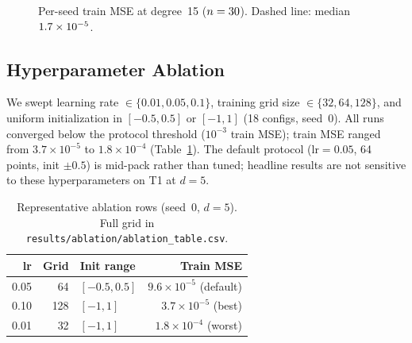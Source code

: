\documentclass[11pt,a4paper]{article}
\begin{document}
\begin{figure}[ht]
\centering
{}
\caption{Per-seed train MSE at degree~15 ($n=30$). Dashed line: median $1.7\times10^{-5}$.}
\label{fig:multiseed_d15}
\end{figure}

\subsection{Hyperparameter Ablation}
\label{sec:ablation}

We swept learning rate $\in\{0.01,0.05,0.1\}$, training grid size $\in\{32,64,128\}$, and uniform initialization in $[-0.5,0.5]$ or $[-1,1]$ (18 configs, seed~0). All runs converged below the protocol threshold ($10^{-3}$ train MSE); train MSE ranged from $3.7\times10^{-5}$ to $1.8\times10^{-4}$ (Table~\ref{tab:ablation}). The default protocol ($\mathrm{lr}=0.05$, 64 points, init $\pm0.5$) is mid-pack rather than tuned; headline results are not sensitive to these hyperparameters on T1 at $d=5$.

\begin{table}[ht]
\centering\small
\begin{tabular}{@{} r r l r @{}}
  \toprule
  \textbf{lr} & \textbf{Grid} & \textbf{Init range} & \textbf{Train MSE} \\
  \midrule
  0.05 & 64 & $[-0.5,0.5]$ & $9.6\times10^{-5}$ (default) \\
  0.10 & 128 & $[-1,1]$ & $3.7\times10^{-5}$ (best) \\
  0.01 & 32 & $[-1,1]$ & $1.8\times10^{-4}$ (worst) \\
  \bottomrule
\end{tabular}
\caption{Representative ablation rows (seed~0, $d=5$). Full grid in \texttt{results/ablation/ablation\_table.csv}.}
\label{tab:ablation}
\end{table}
\end{document}
